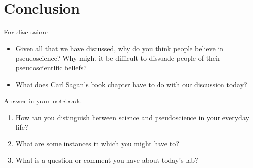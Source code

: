 \documentclass[12pt]{article}
\begin{document}
\section{Conclusion}
For discussion:
\begin{itemize}
\item Given all that we have discussed, why do you think people believe in pseudoscience? Why might it be difficult to dissuade people of their pseudoscientific beliefs?
\item What does Carl Sagan's book chapter have to do with our discussion today?
\end{itemize}
Answer in your notebook:
\begin{enumerate}
\item How can you distinguish between science and pseudoscience in your everyday life? 
\item What are some instances in which you might have to?
\item What is a question or comment you have about today's lab?
\end{enumerate}
\end{document}
